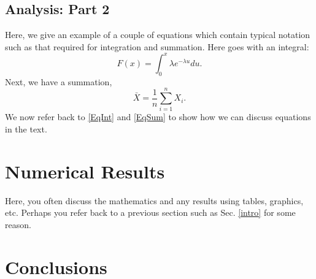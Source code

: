 \documentclass{article}
\begin{document}
\subsection{Analysis: Part 2}\label{analysis2}
Here, we give an example of a couple of equations which contain typical notation such as that required for integration and summation. Here goes with an integral:
\begin{equation}\label{EqInt}
F(x)=\int_0^x \lambda e^{-\lambda u} du.
\end{equation}
Next, we have a summation,
\begin{equation}\label{EqSum}
\bar{X}=\frac{1}{n} \sum_{i=1}^n X_i.
\end{equation}	
We now refer back to \eqref{EqInt} and \eqref{EqSum} to show how we can discuss equations in the text.
\section{Numerical Results}\label{NumRes}
 Here, you often discuss the mathematics and any results using tables, graphics, etc. Perhaps you refer back to a previous section such as Sec. \ref{intro} for some reason.
 \section{Conclusions}\label{Conc}
\end{document}
